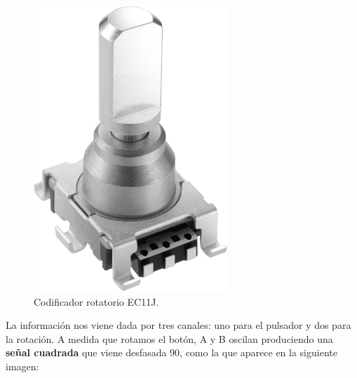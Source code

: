 \begin{figure}[H]
	\noindent \begin{centering}
		\includegraphics[width=\linewidth/4]{capitulo3/EC11J}
		\par\end{centering}
	\smallskip
	\caption{\label{fig:EC11J} Codificador rotatorio EC11J.}
\end{figure} 

\smallskip

La información nos viene dada por tres canales: uno para el pulsador y dos para la rotación. A medida que rotamos el botón, A y B oscilan produciendo una \textbf{señal cuadrada} que viene desfasada 90\textdegree, como la que aparece en la siguiente imagen:

\smallskip

